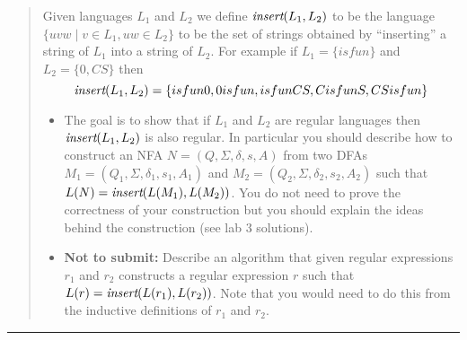 \documentclass[11pt]{article}
\begin{document}
\begin{solution}
\begin{enumerate}
    \end{enumerate}
\end{solution}


\begin{quote}
    Given languages $L_1$ and $L_2$ we define $\text{\em insert}(L_1,L_2)$
    to be the language $\{uvw \mid v \in L_1, uw \in L_2\}$ to be the
    set of strings obtained by ``inserting'' a string of $L_1$ into a
    string of $L_2$. For example if $L_1 = \{isfun\}$ and $L_2 = \{0, CS\}$
    then
    $$\text{\em insert}(L_1,L_2) = \{isfun0,0isfun,isfunCS,CisfunS,CSisfun\}$$
    \begin{itemize}
        \item The goal is to show that if $L_1$ and $L_2$ are regular
            languages then $\text{\em insert}(L_1,L_2)$ is also regular.  In
            particular you should describe how to construct an NFA $N =
            (Q,\Sigma, \delta,s, A)$ from two DFAs
            $M_1=(Q_1,\Sigma,\delta_1,s_1,A_1)$ and
            $M_2=(Q_2,\Sigma,\delta_2,s_2,A_2)$ such that $L(N) = \text{\em
                insert}(L(M_1),L(M_2))$. You do not need to prove the correctness of
            your construction but you should explain the ideas behind the
            construction (see lab 3 solutions).
        \item {\bf Not to submit:} Describe an algorithm that given
            regular expressions $r_1$ and $r_2$ constructs a regular expression
            $r$ such that $L(r) =  \text{\em insert}(L(r_1),L(r_2))$. Note that you
            would need to do this from the inductive definitions of $r_1$ and $r_2$.
    \end{itemize}
\end{quote}
\hrule
\end{document}
